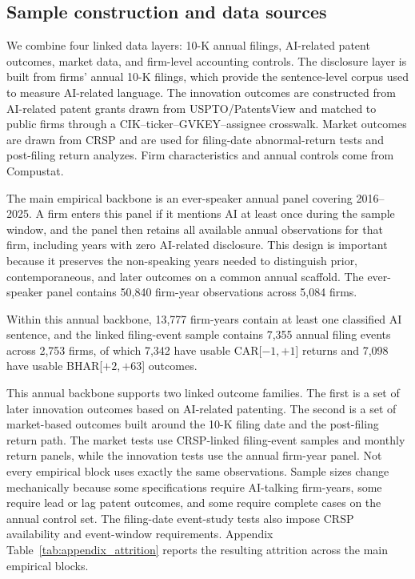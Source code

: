 \subsection{Sample construction and data sources}

We combine four linked data layers:  10-K annual filings, AI-related patent outcomes, market data, and firm-level accounting controls. The disclosure layer is built from firms' annual 10-K filings, which provide the sentence-level corpus used to measure AI-related language. The innovation outcomes are constructed from AI-related patent grants drawn from USPTO/PatentsView and matched to public firms through a CIK--ticker--GVKEY--assignee crosswalk. Market outcomes are drawn from CRSP and are used for filing-date abnormal-return tests and post-filing return analyzes. Firm characteristics and annual controls come from Compustat.

The main empirical backbone is an ever-speaker annual panel covering 2016--2025. A firm enters this panel if it mentions AI at least once during the sample window, and the panel then retains all available annual observations for that firm, including years with zero AI-related disclosure. This design is important because it preserves the non-speaking years needed to distinguish prior, contemporaneous, and later outcomes on a common annual scaffold. The ever-speaker panel contains 50,840 firm-year observations across 5,084 firms.

Within this annual backbone, 13,777 firm-years contain at least one classified AI sentence, and the linked filing-event sample contains 7,355 annual filing events across 2,753 firms, of which 7,342 have usable CAR[$-1,+1$] returns and 7,098 have usable BHAR[$+2,+63$] outcomes.

This annual backbone supports two linked outcome families. The first is a set of later innovation outcomes based on AI-related patenting. The second is a set of market-based outcomes built around the 10-K filing date and the post-filing return path. The market tests use CRSP-linked filing-event samples and monthly return panels, while the innovation tests use the annual firm-year panel. Not every empirical block uses exactly the same observations. Sample sizes change mechanically because some specifications require AI-talking firm-years, some require lead or lag patent outcomes, and some require complete cases on the annual control set. The filing-date event-study tests also impose CRSP availability and event-window requirements. Appendix Table~\ref{tab:appendix_attrition} reports the resulting attrition across the main empirical blocks.

